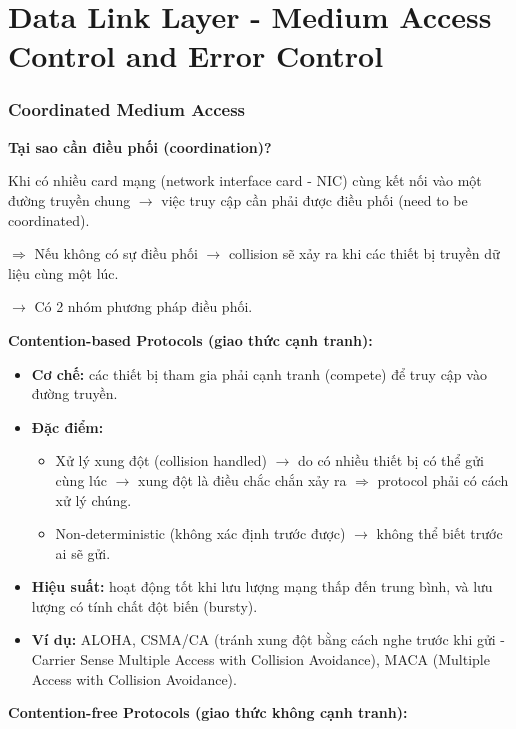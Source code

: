 \chapter{Data Link Layer - Medium Access Control and Error Control}

\subsection{Coordinated Medium Access}

\noindent
\textbf{Tại sao cần điều phối (coordination)?}
\medskip

\noindent
Khi có nhiều card mạng (network interface card - NIC) cùng kết nối vào một đường truyền chung $\rightarrow$ việc truy cập cần phải được điều phối (need to be coordinated).

$\Rightarrow$ Nếu không có sự điều phối $\rightarrow$ collision sẽ xảy ra khi các thiết bị truyền dữ liệu cùng một lúc.
\medskip

\noindent
$\rightarrow$ Có 2 nhóm phương pháp điều phối.
\medskip

\noindent
\textbf{Contention-based Protocols (giao thức cạnh tranh):}

\begin{itemize}
    \item \textbf{Cơ chế:} các thiết bị tham gia phải cạnh tranh (compete) để truy cập vào đường truyền.
    \item \textbf{Đặc điểm:} \begin{itemize}
        \item Xử lý xung đột (collision handled) $\rightarrow$ do có nhiều thiết bị có thể gửi cùng lúc $\rightarrow$ xung đột là điều chắc chắn xảy ra $\Rightarrow$ protocol phải có cách xử lý chúng.
        \item Non-deterministic (không xác định trước được) $\rightarrow$ không thể biết trước ai sẽ gửi.
    \end{itemize}
    \item \textbf{Hiệu suất:} hoạt động tốt khi lưu lượng mạng thấp đến trung bình, và lưu lượng có tính chất đột biến (bursty).
    \item \textbf{Ví dụ:} ALOHA, CSMA/CA (tránh xung đột bằng cách nghe trước khi gửi - Carrier Sense Multiple Access with Collision Avoidance), MACA (Multiple Access with Collision Avoidance).
\end{itemize}
\medskip

\pagebreak

\noindent
\textbf{Contention-free Protocols (giao thức không cạnh tranh):}

